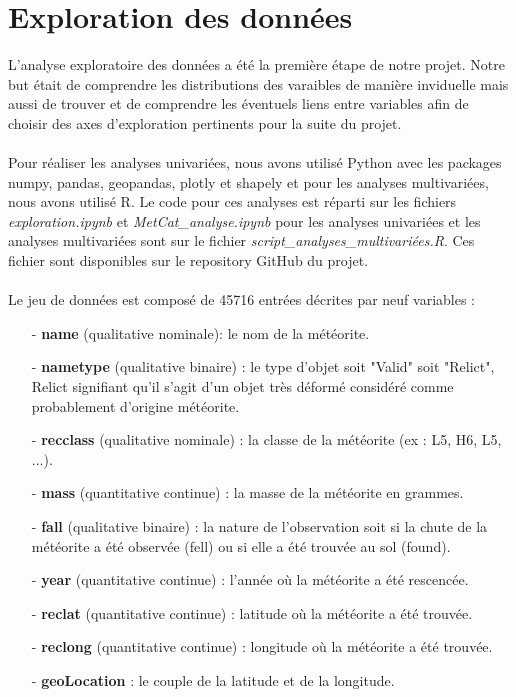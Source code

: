 \documentclass[12pt]{article}
\begin{document}
\section{Exploration des données}
{\setlength{\baselineskip}{1\baselineskip}
L'analyse exploratoire des données a été la première étape de notre projet. Notre but était de comprendre les distributions des varaibles de manière inviduelle mais aussi de trouver et de comprendre les éventuels liens entre variables afin de choisir des axes d'exploration pertinents pour la suite du projet.\\
\\
Pour réaliser les analyses univariées, nous avons utilisé Python avec les packages numpy, pandas, geopandas, plotly et shapely et pour les analyses multivariées, nous avons utilisé R. Le code pour ces analyses est réparti sur les fichiers \textit{exploration.ipynb} et \textit{MetCat\_analyse.ipynb} pour les analyses univariées et les analyses multivariées sont sur le fichier \textit{script\_analyses\_multivariées.R}. Ces fichier sont disponibles sur le repository GitHub du projet.\\
\\
Le jeu de données est composé de 45716 entrées décrites par neuf variables :\\
}
{\setlength{\baselineskip}{1.5\baselineskip}
\begin{itemize}
\item[-] \textbf{name} (qualitative nominale): le nom de la météorite.
\item[-] \textbf{nametype} (qualitative binaire) : le type d'objet soit "Valid" soit "Relict", Relict signifiant qu'il s'agit d'un objet très déformé considéré comme probablement d'origine météorite.
\item[-] \textbf{recclass} (qualitative nominale) : la classe de la météorite (ex : L5, H6, L5, ...).
\item[-] \textbf{mass} (quantitative continue) : la masse de la météorite en grammes.
\item[-] \textbf{fall} (qualitative binaire) : la nature de l'observation soit si la chute de la météorite a été observée (fell) ou si elle a été trouvée au sol (found).
\item[-] \textbf{year} (quantitative continue) : l'année où la météorite a été rescencée.
\item[-] \textbf{reclat} (quantitative continue) : latitude où la météorite a été trouvée.
\item[-] \textbf{reclong} (quantitative continue) : longitude où la météorite a été trouvée.
\item[-]\textbf{geoLocation} : le couple de la latitude et de la longitude.\\
\end{itemize}
}
\end{document}
